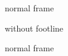 \documentclass{beamer}
\begin{document}
\begin{frame}
normal frame
\end{frame}

\begingroup
{}
\begin{frame}
without footline
\end{frame}
\endgroup

\begin{frame}
normal frame
\end{frame}
\end{document}
